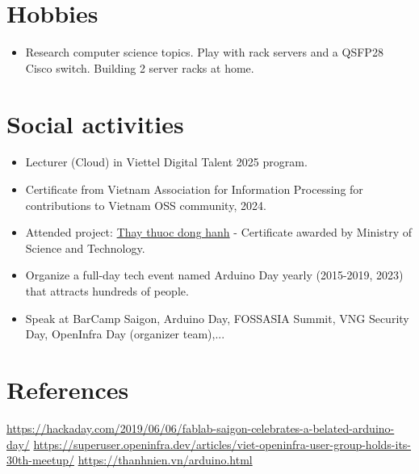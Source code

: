 \documentclass[letterpaper,11pt]{article}
\newcommand{\resumeItemNornal}[1]{
  \item\small{
    {#1 \vspace{-2pt}}
  }
}
\newcommand{\resumeSubItemNormal}[1]{\resumeItemNornal{#1}\vspace{-4pt}}
\newcommand{\resumeSubHeadingListStart}{\begin{itemize}[leftmargin=*]}
\newcommand{\resumeSubHeadingListEnd}{\end{itemize}}
\begin{document}
\section{Hobbies}
  \resumeSubHeadingListStart
    \resumeSubItemNormal
      {Research computer science topics. Play with rack servers and a QSFP28 Cisco switch. Building 2 server racks at home.}
\resumeSubHeadingListEnd

\section{Social activities}
  \resumeSubHeadingListStart
    \resumeSubItemNormal
      {Lecturer (Cloud) in Viettel Digital Talent 2025 program.}
    \resumeSubItemNormal
      {Certificate from Vietnam Association for Information Processing for contributions to Vietnam OSS community, 2024.}
    \resumeSubItemNormal
      {Attended project: \href{https://thaythuocdonghanh.vn}{Thay thuoc dong hanh} - Certificate awarded by Ministry of Science and Technology.}
    \resumeSubItemNormal
      {Organize a full-day tech event named Arduino Day yearly (2015-2019, 2023) that attracts hundreds of people.}
    \resumeSubItemNormal
      {Speak at BarCamp Saigon, Arduino Day, FOSSASIA Summit, VNG Security Day, OpenInfra Day (organizer team),...}
\resumeSubHeadingListEnd

\section{References}
    \small{\href{https://hackaday.com/2019/06/06/fablab-saigon-celebrates-a-belated-arduino-day/}{https://hackaday.com/2019/06/06/fablab-saigon-celebrates-a-belated-arduino-day/}}
    \small{\href{https://superuser.openinfra.dev/articles/viet-openinfra-user-group-holds-its-30th-meetup/}{https://superuser.openinfra.dev/articles/viet-openinfra-user-group-holds-its-30th-meetup/}}\newline
    \small{\href{https://thanhnien.vn/vi-sao-nhieu-nguoi-me-arduino-nen-tang-duoc-cho-la-tien-than-cua-giao-duc-stem-185230704165819482.htm}{https://thanhnien.vn/arduino.html}}
   
\end{document}
